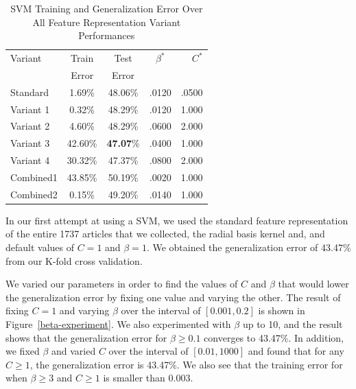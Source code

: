\documentclass{article}
\begin{document}
\begin{table}[b]
\caption{SVM Training and Generalization Error Over All Feature Representation Variant Performances}
\label{svm-feature-experiment}
\vskip 0.15in
\begin{center}
\begin{small}
\begin{sc}
\begin{tabular}{lcccr}
\hline
\abovespace\belowspace
Variant & Train & Test & $\beta^*$ & $C^*$ \\
\ & Error & Error \\
\hline
\abovespace
Standard     & 1.69\% & 48.06\% & .0120 & .0500\\   %
Variant 1    & 0.32\% & 48.29\% & .0120 & 1.000\\
Variant 2    & 4.60\% & 48.29\% & .0600 & 2.000\\
Variant 3    & 42.60\% & {\bf47.07}\% & .0400 & 1.000\\
Variant 4    & 30.32\% & 47.37\% & .0800 & 2.000\\
Combined1    & 43.85\% & 50.19\% & .0020 & 1.000\\
\belowspace
Combined2    & 0.15\% & 49.20\% & .0140 & 1.000\\
\hline
\end{tabular}
\end{sc}
\end{small}
\end{center}
\vskip -0.1in
\end{table}

In our first attempt at using a SVM, we used the standard feature representation of the entire 1737 articles that we collected, the radial basis kernel and, and default values of $C=1$ and $\beta=1$. We obtained the generalization error of 43.47\% from our K-fold cross validation. 

We varied our parameters in order to find the values of $C$ and $\beta$ that would lower the generalization error by fixing one value and varying the other. The result of fixing $C=1$ and varying $\beta$ over the interval of $[0.001, 0.2]$ is shown in Figure~\ref{beta-experiment}. We also experimented with $\beta$ up to 10, and the result shows that the generalization error for $\beta\geq 0.1$ converges to 43.47\%. In addition, we fixed $\beta$ and varied $C$ over the interval of $[0.01, 1000]$ and found that for any $C\geq 1$, the generalization error is 43.47\%. We also see that the training error for when $\beta\geq 3$ and $C\geq1$ is smaller than $0.003$.  
\end{document}

